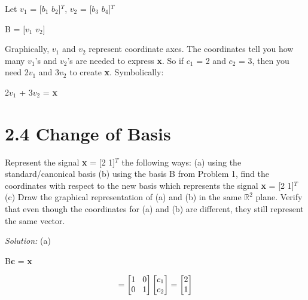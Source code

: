 \documentclass[11pt]{article}
\begin{document}
Let $v_1$ = [$b_1$ $b_2$]$^T$, $v_2$ = [$b_3$ $b_4$]$^T$

\vspace{4mm}
\begin{center}
B =  [\textbf{$v_1$} \textbf{$v_2$}] 

\end{center}

\hspace{3mm}

Graphically, $v_1$ and $v_2$ represent coordinate axes.  The coordinates tell you how many $v_1$'s and $v_2$'s are needed to express \textbf{x}. So if $c_1$ = 2 and $c_2$ = 3, then you need 2$v_1$ and 3$v_2$ to create \textbf{x}. Symbolically:
\begin{center}

2$v_1$ + 3$v_2$ = \textbf{x}

\end{center}

\newpage

\section*{2.4 \hspace{3mm} Change of Basis}

Represent the signal \textbf{x} = [2 1]$^{T}$ the following ways: \newline
(a) using the standard/canonical basis\newline
(b) using the basis B from Problem 1, find the coordinates with respect to the new basis which represents the signal \textbf{x} = [2 1]$^{T}$\newline
(c) Draw the graphical representation of (a) and (b) in the same $\mathbb{R}^2$ plane. Verify that even though the coordinates for (a) and (b) are different, they still represent the same vector.

\vspace{5mm}
\emph{Solution:}\newline
(a)


\begin{center}

B$\textbf{c}$ = \textbf{x}

\end{center}
\begin{center}

\[
=
\begin{bmatrix}
   1 \hspace{3mm} 0 \\
 0 \hspace{3mm} 1
\end{bmatrix}
\begin{bmatrix}
   c_1\\
 c_2 
\end{bmatrix} 
= 
\begin{bmatrix}
   2\\
 1 
\end{bmatrix} 
\]

\end{center}
\end{document}
